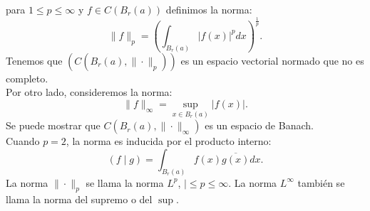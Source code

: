     \begin{example}[Norma $L^{p}$]
      para $1\leq p\leq \infty$ y $f\in C(B_r(a))$ definimos la norma:
      \begin{equation}
        \|f\|_p=\left(\int_{B_r(a)}|f(x)|^{p}dx\right)^{\frac{1}{p}}.\label{eq:n-Lp}
      \end{equation}
      Tenemos que $(C(B_r(a),\|\cdot\|_{p}))$ es un espacio vectorial normado que no es completo.\\
      Por otro lado, consideremos la norma:
      \begin{equation}
        \|f\|_{\infty}=\sup_{x\in B_{r}(a)}|f(x)|.\label{eq:n-infinito}  
      \end{equation}
      Se puede mostrar que $C(B_{r}(a),\|\cdot\|_{\infty})$ es un espacio de Banach.\\
      Cuando $p=2$, la norma es inducida por el producto interno:
      \begin{equation}
        (f\mid g)=\int_{B_{r}(a)}f(x)\overline{g(x)}dx.\label{eq:p.i-de-L2}
      \end{equation}
      La norma $\|\cdot\|_{p}$ se llama la norma $L^{p}$, $|\leq p\leq \infty$. La norma $L^{\infty}$ también se llama la norma del supremo o del $\sup$. 
    \end{example}
